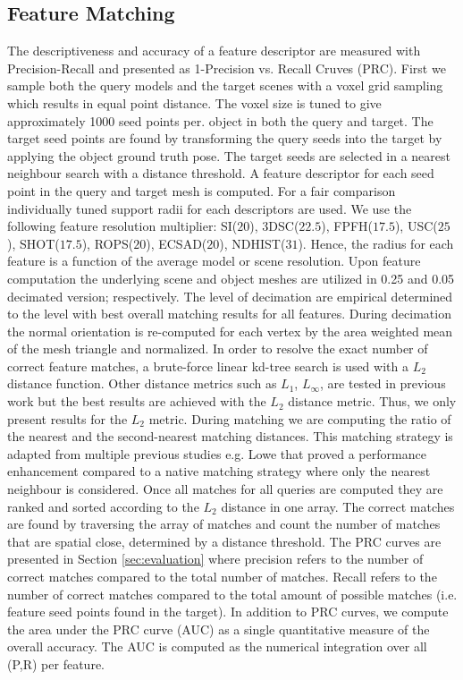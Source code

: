 \documentclass[10pt,twocolumn,letterpaper]{article}
\begin{document}
\subsection{Feature Matching}\label{sec:benchmark_matching}
The descriptiveness and accuracy of a feature descriptor are measured with Precision-Recall and presented as 1-Precision vs. Recall Cruves (PRC). First we sample both the query models and the target scenes with a voxel grid sampling \cite{RusuCousins2011} which results in equal point distance. The voxel size is tuned to give approximately 1000 seed points per. object in both the query and target. The target seed points are found by transforming the query seeds into the target by applying the object ground truth pose. The target seeds are selected in a nearest neighbour search with a distance threshold. A feature descriptor for each seed point in the query and target mesh is computed.  For a fair comparison individually tuned support radii for each descriptors are used. We use the following feature resolution multiplier: SI($20$), 3DSC($22.5$), FPFH($17.5$), USC($25$), SHOT($17.5$), ROPS($20$), ECSAD($20$), NDHIST($31$). Hence, the radius for each feature is a function of the average model or scene resolution. Upon feature computation the underlying scene and object meshes are utilized in 0.25 and 0.05 decimated version; respectively. The level of decimation are empirical determined to the level with best overall matching results for all features. During decimation the normal orientation is re-computed for each vertex by the area weighted mean of the mesh triangle \cite{Thurmer1998} and normalized. In order to resolve the exact number of correct feature matches, a brute-force linear kd-tree search is	 used with a ${L_2}$ distance function. Other distance metrics such as ${L_1}$, ${L_\infty}$, are tested in previous work but the best results are achieved with the $L_2$ distance metric. Thus, we only present results for the ${L_2}$ metric. During matching we are computing the ratio of the nearest and the second-nearest matching distances. This matching strategy is adapted from multiple previous studies e.g. Lowe \etal \cite{Lowe2004} that proved a performance enhancement compared to a native matching strategy where only the nearest neighbour is considered. 
Once all matches for all queries are computed they are ranked and sorted according to the ${L_2}$ distance in one array. The correct matches are found by traversing the array of matches and count the number of matches that are spatial close, determined by a distance threshold. The PRC curves are presented in Section \ref{sec:evaluation} where precision refers to the number of correct matches compared to the total number of matches. Recall refers to the number of correct matches compared to the total amount of possible matches (i.e. feature seed points found in the target). In addition to PRC curves, we compute the area under the PRC curve (AUC) as a single quantitative measure of the overall accuracy. The AUC is computed as the numerical integration over all (P,R) per feature. %
\end{document}
